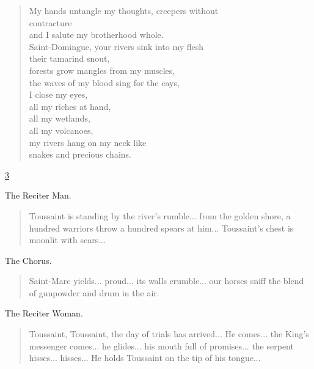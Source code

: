 \documentclass[letterpaper,article,12pt,oneside,notitlepage]{memoir}
\begin{document}
\begin{verse}
My hands untangle my thoughts, creepers without \\
contracture \\
and I salute my brotherhood whole. \\
Saint-Domingue, your rivers sink into my flesh \\
their tamarind snout, \\
forests grow mangles from my muscles, \\
the waves of my blood sing for the cays, \\
I close my eyes, \\
all my riches at hand, \\
all my wetlands, \\
all my volcanoes, \\
my rivers hang on my neck like \\
snakes and precious chains. \\
\end{verse}

\clearpage

\href{http://cesaire.elotroalex.com/chiens/chiens/p003.html}{3}

\begin{center}The Reciter Man.\end{center}

\begin{verse}
\indent Toussaint is standing by the river's rumble... from the golden shore, a hundred warriors throw a hundred spears at him... Toussaint's chest is moonlit with scars... \\
\end{verse}

\begin{center}The Chorus.\end{center}

\begin{verse}
\indent Saint-Marc yields... proud... its walls crumble... our horses sniff the blend of gunpowder and drum in the air. \\
\end{verse}

\begin{center}The Reciter Woman.\end{center}

\begin{verse}
\indent Toussaint, Toussaint, the day of trials has arrived... He comes... the King's messenger comes... he glides... his mouth full of promises... the serpent hisses... hisses... He holds Toussaint on the tip of his tongue... \\
\end{verse}
\end{document}
